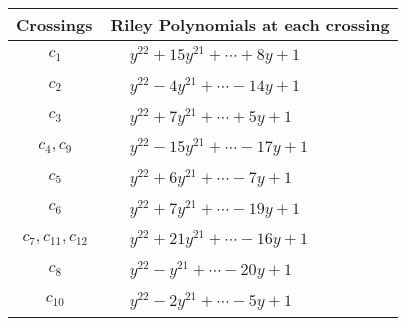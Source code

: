 \documentclass[1p]{elsarticle_modified}
\theoremstyle{definition}
\begin{document}
\begin{tabular}{m{50pt}|m{274pt}}
Crossings & \hspace{64pt}Riley Polynomials at each crossing \\
\hline $$\begin{aligned}c_{1}\end{aligned}$$&$\begin{aligned}
&y^{22}+15 y^{21}+\cdots+8 y+1
\end{aligned}$\\
\hline $$\begin{aligned}c_{2}\end{aligned}$$&$\begin{aligned}
&y^{22}-4 y^{21}+\cdots-14 y+1
\end{aligned}$\\
\hline $$\begin{aligned}c_{3}\end{aligned}$$&$\begin{aligned}
&y^{22}+7 y^{21}+\cdots+5 y+1
\end{aligned}$\\
\hline $$\begin{aligned}c_{4},c_{9}\end{aligned}$$&$\begin{aligned}
&y^{22}-15 y^{21}+\cdots-17 y+1
\end{aligned}$\\
\hline $$\begin{aligned}c_{5}\end{aligned}$$&$\begin{aligned}
&y^{22}+6 y^{21}+\cdots-7 y+1
\end{aligned}$\\
\hline $$\begin{aligned}c_{6}\end{aligned}$$&$\begin{aligned}
&y^{22}+7 y^{21}+\cdots-19 y+1
\end{aligned}$\\
\hline $$\begin{aligned}c_{7},c_{11},c_{12}\end{aligned}$$&$\begin{aligned}
&y^{22}+21 y^{21}+\cdots-16 y+1
\end{aligned}$\\
\hline $$\begin{aligned}c_{8}\end{aligned}$$&$\begin{aligned}
&y^{22}- y^{21}+\cdots-20 y+1
\end{aligned}$\\
\hline $$\begin{aligned}c_{10}\end{aligned}$$&$\begin{aligned}
&y^{22}-2 y^{21}+\cdots-5 y+1
\end{aligned}$\\
\hline
\end{tabular}\\~\\
\end{document}
